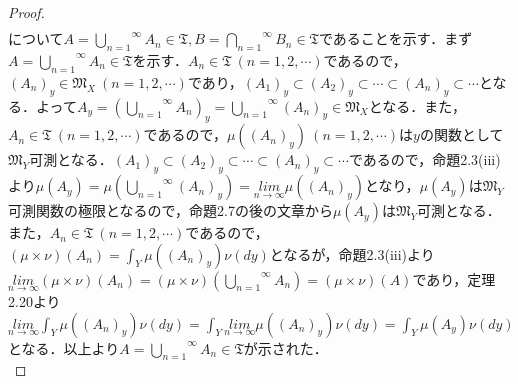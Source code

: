 \documentclass[a4paper,11pt]{jsarticle}
\newtheorem{proof}{証明}
\begin{document}
\begin{proof}
\begin{eqnarray*}
\end{eqnarray*}
について$A=\overset{\infty}{\underset{n=1}{\bigcup}}A_n\in\mathfrak{T},B=\overset{\infty}{\underset{n=1}{\bigcap}}B_n\in\mathfrak{T}$であることを示す．まず$A=\overset{\infty}{\underset{n=1}{\bigcup}}A_n\in\mathfrak{T}$を示す．$A_n\in\mathfrak{T}{\ }(n=1,2,\cdots)$であるので，$(A_n)_y\in \mathfrak{M}_X{\ }(n=1,2,\cdots)$であり，$(A_1)_y\subset (A_2)_y\subset \cdots\subset (A_n)_y\subset \cdots$となる．よって$A_y=\left(\overset{\infty}{\underset{n=1}{\bigcup}}A_n\right)_y=\overset{\infty}{\underset{n=1}{\bigcup}}(A_n)_y\in\mathfrak{M}_X$となる．また，$A_n\in\mathfrak{T}{\ }(n=1,2,\cdots)$であるので，$\mu((A_n)_y){\ }(n=1,2,\cdots)$は$y$の関数として$\mathfrak{M}_Y$可測となる．$(A_1)_y\subset (A_2)_y\subset \cdots\subset (A_n)_y\subset \cdots$であるので，命題2.3(iii)より$\mu(A_y)=\mu(\overset{\infty}{\underset{n=1}{\bigcup}}(A_n)_y)=\underset{n\to \infty}{lim}\mu((A_n)_y)$となり，$\mu(A_y)$は$\mathfrak{M}_Y$可測関数の極限となるので，命題2.7の後の文章から$\mu(A_y)$は$\mathfrak{M}_Y$可測となる．また，$A_n\in\mathfrak{T}{\ }(n=1,2,\cdots)$であるので，$(\mu\times\nu)(A_n)=\int_Y\mu((A_n)_y)\nu(dy)$となるが，命題2.3(iii)より$\underset{n\to \infty}{lim}(\mu\times\nu)(A_n)=(\mu\times\nu)(\overset{\infty}{\underset{n=1}{\bigcup}}A_n)=(\mu\times\nu)(A)$であり，定理2.20より$\underset{n\to \infty}{lim}\int_Y\mu((A_n)_y)\nu(dy)=\int_Y\underset{n\to \infty}{lim}\mu((A_n)_y)\nu(dy)=\int_Y\mu(A_y)\nu(dy)$となる．以上より$A=\overset{\infty}{\underset{n=1}{\bigcup}}A_n\in\mathfrak{T}$が示された．\\

\end{proof}
\end{document}
